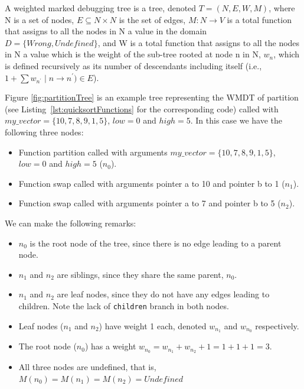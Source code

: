 \begin{definition}
A weighted marked debugging tree is a tree, denoted \(T=(N,E,W,M)\), where N is a set of nodes, \(E\subseteq N \times N\) is the set of edges, \(M:N\to V\) is a total function that assigns to all the nodes in N a value in the domain \(D=\{\mathit{Wrong},\mathit{Undefined}\}\), and W is a total function that assigns to all the nodes in N a value which is the weight of the sub-tree rooted at node n in N, \(w_n\), which is defined recursively as its number of descendants including itself (i.e.,\(1 + \sum {w_{n^\prime}\mid n \to n^{\prime}) \in E}\)).
\theoremstyle{definition}
\begin{exmp}
Figure \ref{fig:partitionTree} is an example tree representing the  WMDT of partition (see Listing~\ref{lst:quicksortFunctions} for the corresponding code) called with \(my\_vector = \{10, 7, 8, 9, 1, 5\}\), \(low = 0\) and \(high = 5\). In this case we have the following three nodes:
\begin{itemize}
    \item Function partition called with arguments \(my\_vector = \{10, 7, 8, 9, 1, 5\}\), \(low = 0\) and \(high = 5\) (\(n_0\)).
    \item Function swap called with arguments pointer a to 10 and pointer b to 1 (\(n_1\)).
    \item Function swap called with arguments pointer a to 7 and pointer b to 5 (\(n_2\)).
\end{itemize}
We can make the following remarks:
\begin{itemize}
    \item \(n_0\) is the root node of the tree, since there is no edge leading to a parent node.
    \item \(n_1\) and \(n_2\) are siblings, since they share the same parent, \(n_0\).
    \item \(n_1\) and \(n_2\) are leaf nodes, since they do not have any edges leading to children. Note the lack of \verb|children| branch in both nodes.
    \item Leaf nodes (\(n_1\) and \(n_2\)) have weight 1 each, denoted \(w_{n_1}\) and \(w_{n_0}\) respectively.
    \item The root node (\(n_0\)) has a weight \(w_{n_0} = w_{n_1} + w_{n_2} + 1 = 1 + 1 + 1 = 3\).  
    \item All three nodes are undefined, that is, \(M(n_0) = M(n_1) = M(n_2) = \mathit{Undefined}\)
\end{itemize}

\begin{figure}[ht]

\begin{verbatim}

\end{verbatim}
\end{figure}
\end{exmp}
\end{definition}

